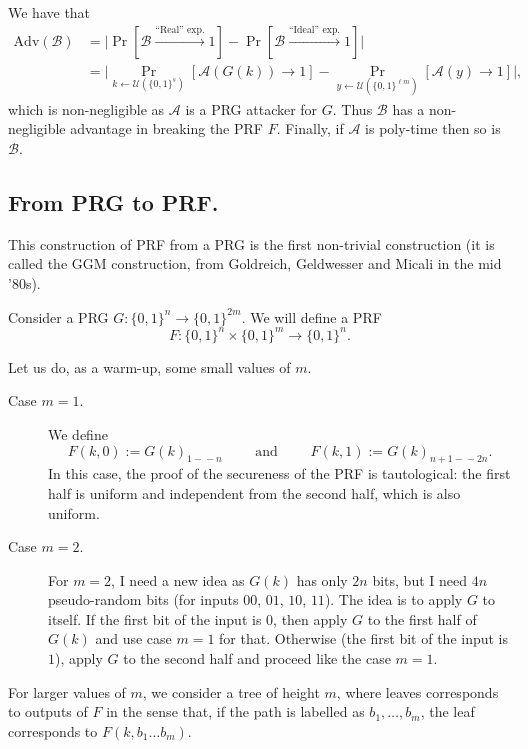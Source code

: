 \documentclass[./main]{subfiles}
\begin{document}
\begin{prv}
    We have that 
    \begin{align*}
      \mathrm{Adv}(\mathcal{B}) &= \big| \Pr[\mathcal{B} \xrightarrow{\text{``Real'' exp.}} 1] - \Pr[\mathcal{B} \xrightarrow{\text{``Ideal'' exp.}} 1]  \big|\\
                                &= \big| \Pr_{k \gets \mathcal{U}(\{0,1\}^s)}[\mathcal{A}(G(k)) \to 1] - \Pr_{y \gets \mathcal{U}(\{0,1\}^{\ell m})}[\mathcal{A}(y) \to 1]\big|
    ,\end{align*}
    which is non-negligible as $\mathcal{A}$ is a PRG attacker for $G$.
    Thus $\mathcal{B}$ has a non-negligible advantage in breaking the PRF $F$.
    Finally, if $\mathcal{A}$ is poly-time then so is  $\mathcal{B}$.
  \end{prv}


  \subsection{From PRG to PRF.}

  This construction of PRF from a PRG is the first non-trivial construction (it is called the GGM construction, from Goldreich, Geldwesser and Micali in the mid '80s).

  Consider a PRG $G : \{0,1\}^n \to \{0,1\}^{2m}$.
  We will define a PRF 
  \[
  F : \{0,1\}^{n} \times \{0,1\}^{m} \to \{0,1\}^n
  .\] 

  Let us do, as a warm-up, some small values of $m$.

  \begin{description}
    \item[Case $m = 1$.]
      We define
      \[
        F(k, 0) := G(k)_{1-\!\!-n} \quad\quad \text{ and }\quad\quad F(k, 1) := G(k)_{n+1 -\!\!- 2n}
      .\]
      In this case, the proof of the secureness of the PRF is tautological: the first half is uniform and independent from the second half, which is also uniform.
    \item[Case $m = 2$.]
      For $m = 2$, I need a new idea as $G(k)$ has only $2n$ bits, but I need $4n$ pseudo-random bits (for inputs $00$, $01$, $10$, $11$).
      The idea is to apply $G$ to itself.
      If the first bit of the input is $0$, then apply $G$ to the first half of $G(k)$ and use case $m=1$ for that.
      Otherwise (the first bit of the input is $1$), apply $G$ to the second half and proceed like the case $m = 1$.
  \end{description}

  For larger values of $m$, we consider a tree of height $m$, where leaves corresponds to outputs of $F$ in the sense that, if the path is labelled as $b_1, \ldots, b_m$, the leaf corresponds to $F(k, b_1 \ldots b_m)$.
\end{document}
